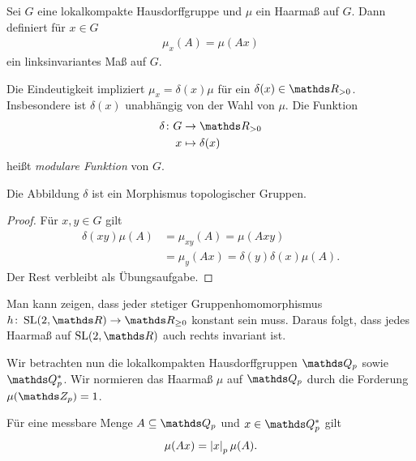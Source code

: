\begin{defi}
Sei $G$ eine lokalkompakte Hausdorffgruppe und $\mu$ ein Haarmaß auf $G$.
Dann definiert für $x\in G$
\begin{align*}
\mu_x(A)=\mu(Ax)
\end{align*}
ein linksinvariantes Maß auf $G$.
\end{defi}

\begin{defi}
Die Eindeutigkeit impliziert $\mu_x=\delta(x) \mu$ für ein $\delta(x)\in \R_{> 0}$.
Insbesondere ist $\delta(x)$ unabhängig von der Wahl von $\mu$.
Die Funktion
\begin{align*}
\delta \colon G &\to \R_{> 0}\\
x &\mapsto \delta(x)
\end{align*}
heißt \emph{modulare Funktion} von $G$.
\end{defi}

\begin{prop}
Die Abbildung $\delta$ ist ein Morphismus topologischer Gruppen.
\end{prop}
\begin{proof}
Für $x,y\in G$ gilt
\begin{align*}
\delta(xy)\mu(A)&=\mu_{xy}(A)=\mu(Axy)\\
&=\mu_y(Ax)=\delta(y)\delta(x)\mu(A).
\end{align*}
Der Rest verbleibt als Übungsaufgabe.
\end{proof}

\begin{bsp}
Man kann zeigen, dass jeder stetiger Gruppenhomomorphismus $h \colon \SL(2,\R)\to \R_{\geq 0}$ konstant sein muss.
Daraus folgt, dass jedes Haarmaß auf $\SL(2,\R)$ auch rechts invariant ist.
\end{bsp}

Wir betrachten nun die lokalkompakten Hausdorffgruppen $\Q_p$ sowie $\Q_p^\ast$.
Wir normieren das Haarmaß $\mu$ auf $\Q_p$ durch die Forderung $\mu(\Z_p)=1$.

\begin{prop}
Für eine messbare Menge $A \subseteq \Q_p$ und $x \in \Q_p^\ast$ gilt
\begin{align*}
\mu(Ax)=\left\vert x\right\vert_p\mu(A).
\end{align*}
\end{prop}

